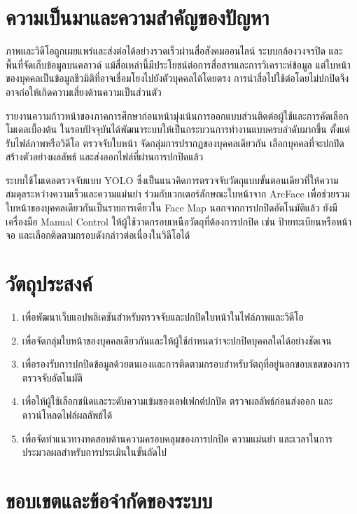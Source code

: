 \section{ความเป็นมาและความสำคัญของปัญหา}

ภาพและวิดีโอถูกเผยแพร่และส่งต่อได้อย่างรวดเร็วผ่านสื่อสังคมออนไลน์ ระบบกล้องวงจรปิด และพื้นที่จัดเก็บข้อมูลบนคลาวด์ แม้สื่อเหล่านี้มีประโยชน์ต่อการสื่อสารและการวิเคราะห์ข้อมูล แต่ใบหน้าของบุคคลเป็นข้อมูลชีวมิติที่อาจเชื่อมโยงไปยังตัวบุคคลได้โดยตรง การนำสื่อไปใช้ต่อโดยไม่ปกปิดจึงอาจก่อให้เกิดความเสี่ยงด้านความเป็นส่วนตัว

รายงานความก้าวหน้าของภาคการศึกษาก่อนหน้ามุ่งเน้นการออกแบบส่วนติดต่อผู้ใช้และการคัดเลือกโมเดลเบื้องต้น ในรอบปัจจุบันได้พัฒนาระบบให้เป็นกระบวนการทำงานแบบครบลำดับมากขึ้น ตั้งแต่รับไฟล์ภาพหรือวิดีโอ ตรวจจับใบหน้า จัดกลุ่มการปรากฏของบุคคลเดียวกัน เลือกบุคคลที่จะปกปิด สร้างตัวอย่างผลลัพธ์ และส่งออกไฟล์ที่ผ่านการปกปิดแล้ว

ระบบใช้โมเดลตรวจจับแบบ YOLO ซึ่งเป็นแนวคิดการตรวจจับวัตถุแบบขั้นตอนเดียวที่ให้ความสมดุลระหว่างความเร็วและความแม่นยำ ร่วมกับเวกเตอร์ลักษณะใบหน้าจาก ArcFace เพื่อช่วยรวมใบหน้าของบุคคลเดียวกันเป็นรายการเดียวใน Face Map นอกจากการปกปิดอัตโนมัติแล้ว ยังมีเครื่องมือ Manual Control ให้ผู้ใช้วาดกรอบเหนือวัตถุที่ต้องการปกปิด เช่น ป้ายทะเบียนหรือหน้าจอ และเลือกติดตามกรอบดังกล่าวต่อเนื่องในวิดีโอได้

\section{วัตถุประสงค์}

\begin{enumerate}
    \item เพื่อพัฒนาเว็บแอปพลิเคชันสำหรับตรวจจับและปกปิดใบหน้าในไฟล์ภาพและวิดีโอ
    \item เพื่อจัดกลุ่มใบหน้าของบุคคลเดียวกันและให้ผู้ใช้กำหนดว่าจะปกปิดบุคคลใดได้อย่างชัดเจน
    \item เพื่อรองรับการปกปิดข้อมูลด้วยตนเองและการติดตามกรอบสำหรับวัตถุที่อยู่นอกขอบเขตของการตรวจจับอัตโนมัติ
    \item เพื่อให้ผู้ใช้เลือกชนิดและระดับความเข้มของเอฟเฟกต์ปกปิด ตรวจผลลัพธ์ก่อนส่งออก และดาวน์โหลดไฟล์ผลลัพธ์ได้
    \item เพื่อจัดทำแนวทางทดสอบด้านความครอบคลุมของการปกปิด ความแม่นยำ และเวลาในการประมวลผลสำหรับการประเมินในขั้นถัดไป
\end{enumerate}

\section{ขอบเขตและข้อจำกัดของระบบ}


